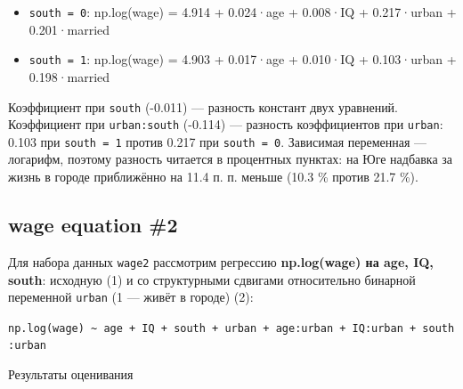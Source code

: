 \documentclass[
  russian,
]{article}
\providecommand{\tightlist}{%
  \setlength{\itemsep}{0pt}\setlength{\parskip}{0pt}}
\begin{document}
\begin{tcolorbox}[enhanced jigsaw, arc=.35mm, bottomrule=.15mm, bottomtitle=1mm, breakable, colback=white, colbacktitle=quarto-callout-tip-color!10!white, colframe=quarto-callout-tip-color-frame, coltitle=black, left=2mm, leftrule=.75mm, opacityback=0, opacitybacktitle=0.6, rightrule=.15mm, title=\textcolor{quarto-callout-tip-color}{\faLightbulb}\hspace{0.5em}{Ответ}, titlerule=0mm, toprule=.15mm, toptitle=1mm]

\begin{itemize}
\tightlist
\item
  \texttt{south\ =\ 0}: np.log(wage) = 4.914 + 0.024·age + 0.008·IQ +
  0.217·urban + 0.201·married
\item
  \texttt{south\ =\ 1}: np.log(wage) = 4.903 + 0.017·age + 0.010·IQ +
  0.103·urban + 0.198·married
\end{itemize}

Коэффициент при \texttt{south} (-0.011) --- разность констант двух
уравнений. Коэффициент при \texttt{urban:south} (-0.114) --- разность
коэффициентов при \texttt{urban}: 0.103 при \texttt{south\ =\ 1} против
0.217 при \texttt{south\ =\ 0}. Зависимая переменная --- логарифм,
поэтому разность читается в процентных пунктах: на Юге надбавка за жизнь
в городе приближённо на 11.4 п. п. меньше (10.3 \% против 21.7 \%).

\end{tcolorbox}

\subsection{wage equation \#2}\label{wage-equation-2}

Для набора данных \texttt{wage2} рассмотрим регрессию
\textbf{np.log(wage) на age, IQ, south}: исходную (1) и со структурными
сдвигами относительно бинарной переменной \texttt{urban} (1 --- живёт в
городе) (2):

\texttt{np.log(wage)\ \textasciitilde{}\ age\ +\ IQ\ +\ south\ +\ urban\ +\ age:urban\ +\ IQ:urban\ +\ south:urban}

Результаты оценивания
\end{document}
